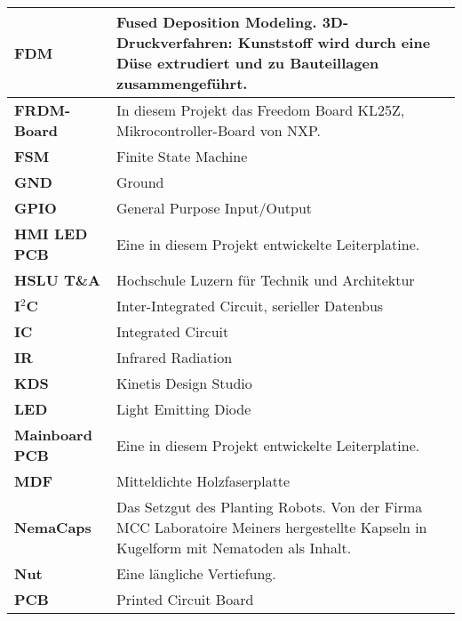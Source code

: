\begin{table}[H]
\begin{tabular}{|L{3cm}|L{12.3cm}|}
		\hline
		\textbf{FDM} & Fused Deposition Modeling. 3D-Druckverfahren: Kunststoff wird durch eine Düse extrudiert und zu Bauteillagen zusammengeführt.\\

		\hline		
		\textbf{FRDM-Board} & In diesem Projekt das Freedom Board KL25Z, Mikrocontroller-Board von NXP. \\
		
		\hline
		\textbf{FSM} & Finite State Machine\\
		
		\hline
		\textbf{GND} & Ground\\
	
		\hline
		\textbf{GPIO} & General Purpose Input/Output\\
	
		\hline
		\textbf{HMI LED PCB} & Eine in diesem Projekt entwickelte Leiterplatine. \\
	
		\hline
		\textbf{HSLU T\&A} & Hochschule Luzern für Technik und Architektur\\ 
		
		\hline
		\textbf{I$^{2}$C} & Inter-Integrated Circuit, serieller Datenbus\\
		
		\hline
		\textbf{IC} & Integrated Circuit\\
		
		\hline
		\textbf{IR} & Infrared Radiation\\
		
		\hline
		\textbf{KDS} & Kinetis Design Studio\\

		\hline
		\textbf{LED} & Light Emitting Diode\\

		\hline
		\textbf{Mainboard PCB} & Eine in diesem Projekt entwickelte Leiterplatine. \\

		\hline
		\textbf{MDF} &  Mitteldichte Holzfaserplatte  \\		

		\hline
		\textbf{NemaCaps} &  Das Setzgut des Planting Robots. Von der Firma MCC Laboratoire Meiners hergestellte Kapseln in Kugelform mit Nematoden als Inhalt. \\

		\hline
		\textbf{Nut} &  Eine längliche Vertiefung.\\	
		
	 	\hline
	 	\textbf{PCB} &	Printed Circuit Board\\
		

\end{tabular}
\end{table}

